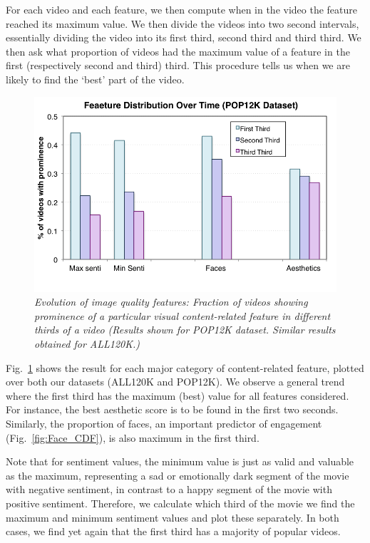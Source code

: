 For each video and each feature, we then compute when in the video the feature reached its maximum value. We then divide the videos into two second intervals, essentially dividing the video into its first third, second third and third third. We then ask what proportion of videos had the maximum value of a feature in the first (respectively second and third) third. This procedure tells us when we are likely to find the `best' part of the video. 

\begin{figure}[!htb]
\centering
\includegraphics[width=\columnwidth]{plots/ThirdsDistribution.png}
\caption{\textsl{Evolution of image quality features: Fraction of videos showing prominence of a particular visual content-related feature in different thirds of a video (Results shown for POP12K dataset. Similar results obtained for ALL120K.)}}
\label{fig:Face_Thirds}
\end{figure}

Fig.~\ref{fig:Face_Thirds} shows the result for each major category of content-related feature, plotted over both our datasets (ALL120K and POP12K). We observe a general trend where the first third has the maximum (best) value for all features considered. For instance, the best aesthetic score is to be found in the first two seconds. Similarly, the proportion of faces, an important predictor of engagement (Fig.~\ref{fig:Face_CDF}), is also maximum in the first third. 

Note that for sentiment values, the minimum value is just as valid and valuable as the maximum, representing a sad or emotionally dark segment of the movie with negative sentiment, in contrast to a happy segment of the movie with positive sentiment. Therefore, we calculate which third of the movie we find the maximum and minimum sentiment values and plot these separately. In both cases, we find  yet again that the first third has a majority of popular videos. 

